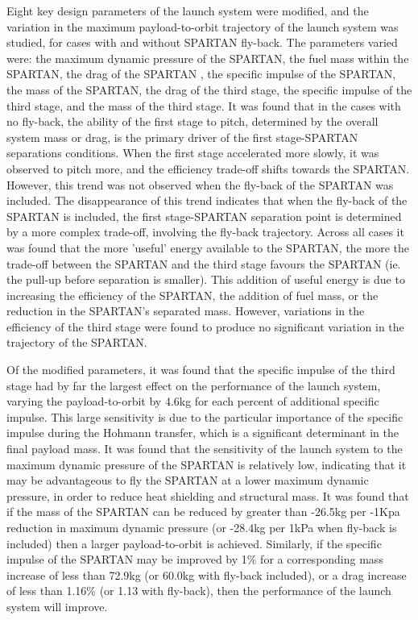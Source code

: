 Eight key design parameters of the launch system were modified, and the variation in the maximum payload-to-orbit trajectory of the launch system was studied, for cases with and without SPARTAN fly-back. 
The parameters varied were: the maximum dynamic pressure of the SPARTAN, the fuel mass within the SPARTAN, the drag of the SPARTAN , the specific impulse of the SPARTAN, the mass of the SPARTAN, the drag of the third stage, the specific impulse of the third stage, and the mass of the third stage. 
It was found that in the cases with no fly-back, the ability of the first stage to pitch, determined by the overall system mass or drag, is the primary driver of the first stage-SPARTAN separations conditions. When the first stage accelerated more slowly, it was observed to pitch more, and the efficiency trade-off shifts towards the SPARTAN. However, this trend was not observed when the fly-back of the SPARTAN was included. The disappearance of this trend indicates that when the fly-back of the SPARTAN is included, the first stage-SPARTAN separation point is determined by a more complex trade-off, involving the fly-back trajectory. 
Across all cases it was found that the more 'useful' energy available to the SPARTAN, the more the trade-off between the SPARTAN and the third stage favours the SPARTAN (ie. the pull-up before separation is smaller). This addition of useful energy is due to increasing the efficiency of the SPARTAN, the addition of fuel mass, or the reduction in the SPARTAN's separated mass.
However, variations in the efficiency of the third stage were found to produce no significant variation in the trajectory of the SPARTAN. 

Of the modified parameters, it was found that the specific impulse of the third stage had by far the largest effect on the performance of the launch system, varying the payload-to-orbit by 4.6kg for each percent of additional specific impulse. This large sensitivity is due to the particular importance of the specific impulse during the Hohmann transfer, which is a significant determinant in the final payload mass. 
It was found that the sensitivity of the launch system to the maximum dynamic pressure of the SPARTAN is relatively low, indicating that it may be advantageous to fly the SPARTAN at a lower maximum dynamic pressure, in order to reduce heat shielding and structural mass. It was found that if the mass of the SPARTAN can be reduced by greater than -26.5kg per -1Kpa reduction in maximum dynamic pressure (or -28.4kg per 1kPa when fly-back is included) then a larger payload-to-orbit is achieved.
Similarly, if the specific impulse of the SPARTAN may be improved by 1\% for a corresponding mass increase of less than 72.9kg (or 60.0kg with fly-back included), or a drag increase of less than 1.16\% (or 1.13 with fly-back), then the performance of the launch system will improve. 

